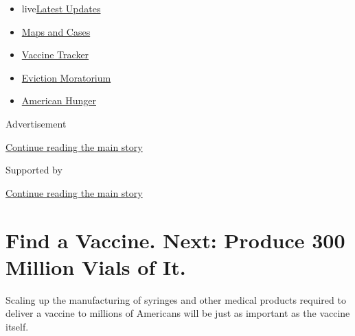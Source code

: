 \begin{itemize}
\tightlist
\item
  live\href{https://www.nytimes3xbfgragh.onion/2020/09/09/world/covid-19-coronavirus.html?name=styln-coronavirus-national\&region=TOP_BANNER\&block=storyline_menu_recirc\&action=click\&pgtype=Article\&impression_id=7aa06791-f28b-11ea-b918-ff3c9aed24f9\&variant=undefined}{Latest
  Updates}
\item
  \href{https://www.nytimes3xbfgragh.onion/interactive/2020/us/coronavirus-us-cases.html?name=styln-coronavirus-national\&region=TOP_BANNER\&block=storyline_menu_recirc\&action=click\&pgtype=Article\&impression_id=7aa06792-f28b-11ea-b918-ff3c9aed24f9\&variant=undefined}{Maps
  and Cases}
\item
  \href{https://www.nytimes3xbfgragh.onion/interactive/2020/science/coronavirus-vaccine-tracker.html?name=styln-coronavirus-national\&region=TOP_BANNER\&block=storyline_menu_recirc\&action=click\&pgtype=Article\&impression_id=7aa06793-f28b-11ea-b918-ff3c9aed24f9\&variant=undefined}{Vaccine
  Tracker}
\item
  \href{https://www.nytimes3xbfgragh.onion/2020/09/02/your-money/eviction-moratorium-covid.html?name=styln-coronavirus-national\&region=TOP_BANNER\&block=storyline_menu_recirc\&action=click\&pgtype=Article\&impression_id=7aa103d0-f28b-11ea-b918-ff3c9aed24f9\&variant=undefined}{Eviction
  Moratorium}
\item
  \href{https://www.nytimes3xbfgragh.onion/interactive/2020/09/02/magazine/food-insecurity-hunger-us.html?name=styln-coronavirus-national\&region=TOP_BANNER\&block=storyline_menu_recirc\&action=click\&pgtype=Article\&impression_id=7aa103d1-f28b-11ea-b918-ff3c9aed24f9\&variant=undefined}{American
  Hunger}
\end{itemize}

Advertisement

\protect\hyperlink{after-top}{Continue reading the main story}

Supported by

\protect\hyperlink{after-sponsor}{Continue reading the main story}

\hypertarget{find-a-vaccine-next-produce-300-million-vials-of-it}{%
\section{Find a Vaccine. Next: Produce 300 Million Vials of
It.}\label{find-a-vaccine-next-produce-300-million-vials-of-it}}

Scaling up the manufacturing of syringes and other medical products
required to deliver a vaccine to millions of Americans will be just as
important as the vaccine itself.


